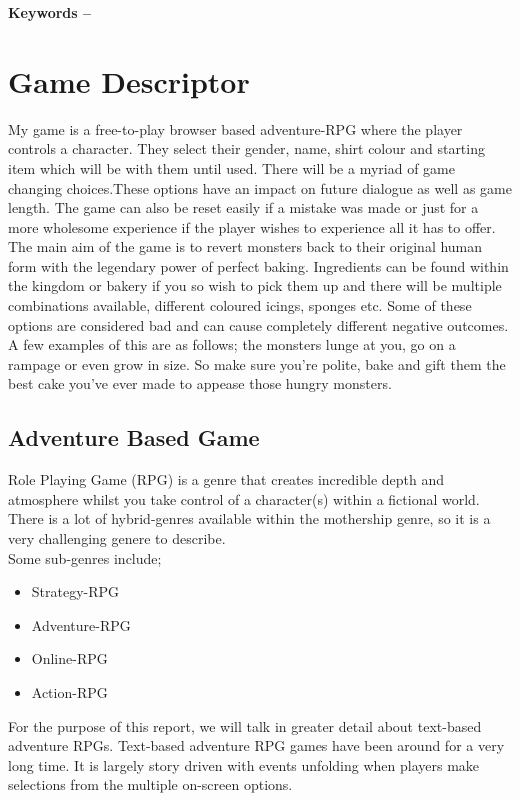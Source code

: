 \documentclass[10pt, a4paper]{article}
\title{\mytitle}
\author{\myauthor\hspace{1em}\\\contact\\Edinburgh Napier University\hspace{0.5em}-\hspace{0.5em}\mymodule}
\date{}
\begin{document}
    \maketitle
    \begin{abstract}
        \lipsum[2]
    \end{abstract}
    
    \textbf{Keywords -- }{\mykeywords}
    
    \section{Game Descriptor}
	My game is a free-to-play browser based adventure-RPG where the player controls a character. They select their gender,
	name, shirt colour and starting item which will be with them until used. There will be a myriad of game changing choices.These options have an impact on future dialogue as well as game length. The game can also be reset easily if a mistake was made or just for a more wholesome experience if the player wishes to experience all it has to offer. \\
    The main aim of the game is to revert monsters back to their original human form with the legendary power of perfect baking. Ingredients can be found within the kingdom or bakery if you so wish to pick them up and there will be multiple combinations available, different coloured icings, sponges etc. Some of these options are considered bad and can cause completely different negative outcomes. A few examples of this are as follows; the monsters lunge at you, go on a rampage or even grow in size. So make sure you're polite, bake and gift them the best cake you've ever made to appease those hungry monsters.
    
	\subsection{Adventure Based Game}
	Role Playing Game (RPG) is a genre that creates incredible depth and atmosphere whilst you take control of a character(s)
	within a fictional world. There is a lot of hybrid-genres available within the mothership genre, so it is a very
	challenging genere to describe.\\
	Some sub-genres include; 
	\begin{itemize}
		\item Strategy-RPG
		\item Adventure-RPG
		\item Online-RPG
		\item Action-RPG
	\end{itemize}
	For the purpose of this report, we will talk in greater detail about text-based adventure RPGs.
	Text-based adventure RPG games have been around for a very long time. It is largely story driven
	with events unfolding when players make selections from the multiple on-screen options.
	
\end{document}
